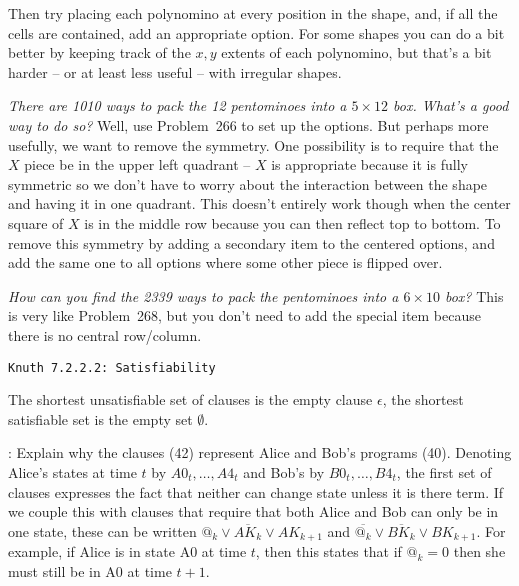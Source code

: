 Then try placing each polynomino at every position in the shape, and, if all
the cells are contained, add an appropriate option.  For some shapes you can
do a bit better by keeping track of the $x, y$ extents of each polynomino, but
that's a bit harder -- or at least less useful -- with irregular shapes.

 {\it There are 1010 ways to pack the 12 pentominoes into 
a $5 \times 12$ box.  What's a good way to do so?}\hfil\break
Well, use Problem~266 to set up the options.  But perhaps more usefully, we
want to remove the symmetry.  One possibility is to require that the $X$ piece
be in the upper left quadrant -- $X$ is appropriate because it is fully symmetric
so we don't have to worry about the interaction between the shape and having
it in one quadrant.  This doesn't entirely work though when the center square
of $X$ is in the middle row because you can then reflect top to bottom.  To
remove this symmetry by adding a secondary item to the centered options,
and add the same one to all options where some other piece is flipped over.

 {\it How can you find the 2339 ways to pack the 
pentominoes into a $6 \times 10$ box?}\hfil\break
This is very like Problem~268, but you don't need to add the special item
because there is no central row/column.


\topglue 0.5in
\centerline{\tt Knuth 7.2.2.2: Satisfiability}
\vskip 0.3in

 The shortest unsatisfiable set of clauses is the
empty clause $\epsilon$, the shortest satisfiable set is the empty set $\emptyset$.

: Explain why the clauses (42) represent Alice and Bob's
programs (40).\hfil\break
Denoting Alice's states at time $t$ by $A0_t, \ldots, A4_t$ and Bob's by $B0_t, \ldots, B4_t$,
the first set of clauses expresses the fact that neither can change state unless it is there term.
If we couple this with clauses that require that both Alice and Bob can only be in one
state, these can be written $@_k \vee \overline{AK_{k}} \vee AK_{k+1}$
and $\overline{@_k} \vee \overline{BK_{k}} \vee BK_{k+1}$.  For example, if Alice is in state
A0 at time $t$, then this states that if $@_k = 0$ then she must still be in A0 at
time $t+1$.

